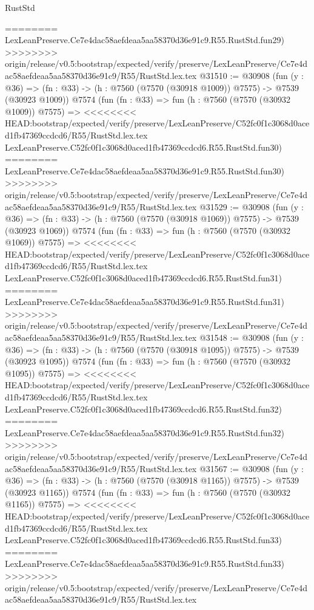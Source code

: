\begin{lexlean}{RustStd}
\begin{coremodule}
{\begin{coremodule}
{{{{{{{{{{{{{{{{{{{{{{{{{{{{{{{{{{{{{{{{{{{========
    LexLeanPreserve.Ce7e4dac58aefdeaa5aa58370d36e91c9.R55.RustStd.fun29)
>>>>>>>> origin/release/v0.5:bootstrap/expected/verify/preserve/LexLeanPreserve/Ce7e4dac58aefdeaa5aa58370d36e91c9/R55/RustStd.lex.tex
@31510 := @30908
    (fun (y : @36) =>
    (fn : @33) -> (h : @7560 (@7570 (@30918 @1009)) @7575) -> @7539 (@30923 @1009))
    @7574
    (fun (fn : @33) =>
    fun (h : @7560 (@7570 (@30932 @1009)) @7575) =>
<<<<<<<< HEAD:bootstrap/expected/verify/preserve/LexLeanPreserve/C52fc0f1c3068d0aced1fb47369ccdcd6/R55/RustStd.lex.tex
    LexLeanPreserve.C52fc0f1c3068d0aced1fb47369ccdcd6.R55.RustStd.fun30)
========
    LexLeanPreserve.Ce7e4dac58aefdeaa5aa58370d36e91c9.R55.RustStd.fun30)
>>>>>>>> origin/release/v0.5:bootstrap/expected/verify/preserve/LexLeanPreserve/Ce7e4dac58aefdeaa5aa58370d36e91c9/R55/RustStd.lex.tex
@31529 := @30908
    (fun (y : @36) =>
    (fn : @33) -> (h : @7560 (@7570 (@30918 @1069)) @7575) -> @7539 (@30923 @1069))
    @7574
    (fun (fn : @33) =>
    fun (h : @7560 (@7570 (@30932 @1069)) @7575) =>
<<<<<<<< HEAD:bootstrap/expected/verify/preserve/LexLeanPreserve/C52fc0f1c3068d0aced1fb47369ccdcd6/R55/RustStd.lex.tex
    LexLeanPreserve.C52fc0f1c3068d0aced1fb47369ccdcd6.R55.RustStd.fun31)
========
    LexLeanPreserve.Ce7e4dac58aefdeaa5aa58370d36e91c9.R55.RustStd.fun31)
>>>>>>>> origin/release/v0.5:bootstrap/expected/verify/preserve/LexLeanPreserve/Ce7e4dac58aefdeaa5aa58370d36e91c9/R55/RustStd.lex.tex
@31548 := @30908
    (fun (y : @36) =>
    (fn : @33) -> (h : @7560 (@7570 (@30918 @1095)) @7575) -> @7539 (@30923 @1095))
    @7574
    (fun (fn : @33) =>
    fun (h : @7560 (@7570 (@30932 @1095)) @7575) =>
<<<<<<<< HEAD:bootstrap/expected/verify/preserve/LexLeanPreserve/C52fc0f1c3068d0aced1fb47369ccdcd6/R55/RustStd.lex.tex
    LexLeanPreserve.C52fc0f1c3068d0aced1fb47369ccdcd6.R55.RustStd.fun32)
========
    LexLeanPreserve.Ce7e4dac58aefdeaa5aa58370d36e91c9.R55.RustStd.fun32)
>>>>>>>> origin/release/v0.5:bootstrap/expected/verify/preserve/LexLeanPreserve/Ce7e4dac58aefdeaa5aa58370d36e91c9/R55/RustStd.lex.tex
@31567 := @30908
    (fun (y : @36) =>
    (fn : @33) -> (h : @7560 (@7570 (@30918 @1165)) @7575) -> @7539 (@30923 @1165))
    @7574
    (fun (fn : @33) =>
    fun (h : @7560 (@7570 (@30932 @1165)) @7575) =>
<<<<<<<< HEAD:bootstrap/expected/verify/preserve/LexLeanPreserve/C52fc0f1c3068d0aced1fb47369ccdcd6/R55/RustStd.lex.tex
    LexLeanPreserve.C52fc0f1c3068d0aced1fb47369ccdcd6.R55.RustStd.fun33)
========
    LexLeanPreserve.Ce7e4dac58aefdeaa5aa58370d36e91c9.R55.RustStd.fun33)
>>>>>>>> origin/release/v0.5:bootstrap/expected/verify/preserve/LexLeanPreserve/Ce7e4dac58aefdeaa5aa58370d36e91c9/R55/RustStd.lex.tex
}}}}}}}}}}}}}}}}}}}}}}}}}}}}}}}}}}}}}}}}}}}
\end{coremodule}}
\end{coremodule}
\end{lexlean}
